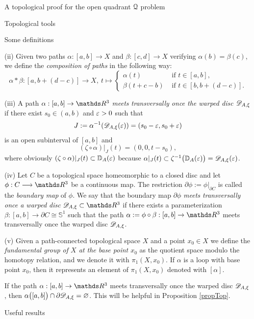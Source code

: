 \documentclass[11pt, a4paper, english, twoside, notitlepage, openright]{report}
\begin{document}
\begin{chapter}{A topological proof for the open quadrant $\mathcal{Q}$ problem}
\begin{section}{Topological tools}
\begin{subsection}{Some definitions}
\begin{definitions}
(ii) Given two paths $\alpha:[a, b] \to X$ and $\beta:[c, d] \to X$ verifying $\alpha(b) = \beta(c)$, we define the \emph{composition of paths} in the following way:
$$
\alpha * \beta: [a, b+(d-c)] \longrightarrow X,\ t \longmapsto
\left\{
\begin{array}{ll}
\alpha(t) &\text{ if } t\in[a,b],\\
\beta(t+c-b) &\text{ if } t\in[b, b+(d-c)].
\end{array}
\right.
$$

(iii) A path $\alpha:[a,b]\rightarrow\R^3$ \emph{meets transversally once the warped disc $\mathscr{D}_{A,\xi}$} if there exist $s_0\in(a,b)$ and $\varepsilon>0$ such that
$$
J:=\alpha^{-1}(\mathscr{D}_{A,\xi}(\varepsilon))=(s_0-\varepsilon,s_0+\varepsilon)
$$
is an open subinterval of $[a,b]$ and 
$$
(\zeta\circ\alpha)|_J(t)=(0,0,t-s_0),
$$
where obviously $(\zeta\circ\alpha)|_J(t) \subset \mathbb{D}_A(\varepsilon)$ because $\alpha|_J(t) \subset \zeta^{-1}\big(\mathbb{D}_A(\varepsilon)\big) = \mathscr{D}_{A,\xi}(\varepsilon)$.

(iv) Let $C$ be a topological space homeomorphic to a closed disc and let $\phi:C\longrightarrow\R^3$ be a continuous map. The restriction $\partial\phi:=\phi|_{\partial C}$ is called the \textit{boundary map} of $\phi$. We say that the boundary map $\partial\phi$ \emph{meets transversally once a warped disc} $\D_{A,\xi}\subset\R^3$ if there exists a parameterization $\beta:[a,b]\to\partial C \cong \mathbb{S}^1$ such that the path $\alpha:=\phi\circ\beta: [a,b] \to \R^3$ meets transversally once the warped disc $\mathscr{D}_{A,\xi}$.

(v) Given a path-connected topological space $X$ and a point $x_0\in X$ we define the \emph{fundamental group of $X$ at the base point $x_0$} as the quotient space modulo the homotopy relation, and we denote it with $\pi_1(X,x_0)$. If $\alpha$ is a loop with base point $x_0$, then it represents an element of $\pi_1(X,x_0)$ denoted with $[\alpha]$.
\end{definitions}

\begin{remark}\label{remPath}
If the path $\alpha:[a,b]\to\R^3$ meets transversally once the warped disc $\mathscr{D}_{A,\xi}$, then $\alpha\big([a,b]\big)\cap\partial\mathscr{D}_{A,\xi}=\varnothing$. This will be helpful in Proposition \ref{propTop}.
\end{remark}
\end{subsection}
\begin{subsection}{Useful results}


\end{subsection}
\end{section}
\end{chapter}
\end{document}

